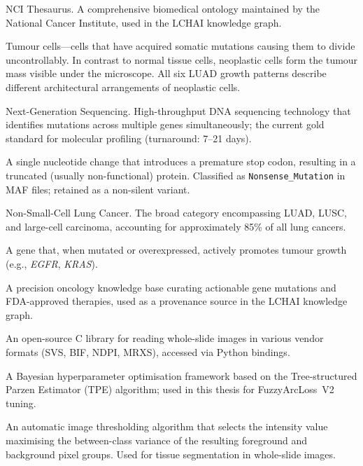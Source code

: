 \begin{description}[style=nextline,leftmargin=4cm]
\item[NCIt] NCI Thesaurus.  A comprehensive biomedical ontology maintained by the National Cancer Institute, used in the LCHAI knowledge graph.


\item[Neoplastic cells] Tumour cells---cells that have acquired somatic mutations causing them to divide uncontrollably.  In contrast to normal tissue cells, neoplastic cells form the tumour mass visible under the microscope.  All six LUAD growth patterns describe different architectural arrangements of neoplastic cells.


\item[NGS] Next-Generation Sequencing.  High-throughput DNA sequencing technology that identifies mutations across multiple genes simultaneously; the current gold standard for molecular profiling (turnaround: 7--21 days).


\item[Nonsense mutation] A single nucleotide change that introduces a premature stop codon, resulting in a truncated (usually non-functional) protein.  Classified as \texttt{Nonsense\_Mutation} in MAF files; retained as a non-silent variant.


\item[NSCLC] Non-Small-Cell Lung Cancer.  The broad category encompassing LUAD, LUSC, and large-cell carcinoma, accounting for approximately 85\% of all lung cancers.


\item[Oncogene] A gene that, when mutated or overexpressed, actively promotes tumour growth (e.g., \emph{EGFR}, \emph{KRAS}).


\item[OncoKB] A precision oncology knowledge base curating actionable gene mutations and FDA-approved therapies, used as a provenance source in the LCHAI knowledge graph.


\item[OpenSlide] An open-source C library for reading whole-slide images in various vendor formats (SVS, BIF, NDPI, MRXS), accessed via Python bindings.


\item[Optuna] A Bayesian hyperparameter optimisation framework based on the Tree-structured Parzen Estimator (TPE) algorithm; used in this thesis for FuzzyArcLoss~V2 tuning.


\item[Otsu's method] An automatic image thresholding algorithm that selects the intensity value maximising the between-class variance of the resulting foreground and background pixel groups.  Used for tissue segmentation in whole-slide images.



\end{description}
